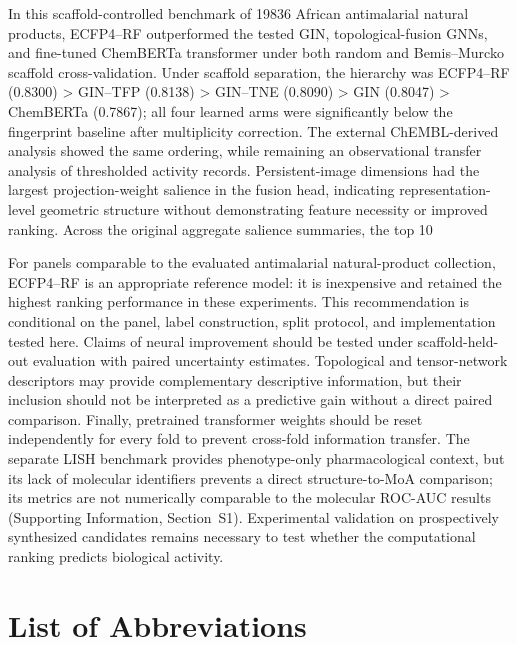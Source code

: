 \documentclass[11pt,a4paper]{article}
\begin{document}
In this scaffold-controlled benchmark of \num{19836} African antimalarial natural products, ECFP4--RF outperformed the tested GIN, topological-fusion GNNs, and fine-tuned ChemBERTa transformer under both random and Bemis--Murcko scaffold cross-validation. Under scaffold separation, the hierarchy was ECFP4--RF (\num{0.8300}) > GIN--TFP (\num{0.8138}) > GIN--TNE (\num{0.8090}) > GIN (\num{0.8047}) > ChemBERTa (\num{0.7867}); all four learned arms were significantly below the fingerprint baseline after multiplicity correction. The external ChEMBL-derived analysis showed the same ordering, while remaining an observational transfer analysis of thresholded activity records. Persistent-image dimensions had the largest projection-weight salience in the fusion head, indicating representation-level geometric structure without demonstrating feature necessity or improved ranking. Across the original aggregate salience summaries, the top 10%

For panels comparable to the evaluated antimalarial natural-product collection, ECFP4--RF is an appropriate reference model: it is inexpensive and retained the highest ranking performance in these experiments. This recommendation is conditional on the panel, label construction, split protocol, and implementation tested here. Claims of neural improvement should be tested under scaffold-held-out evaluation with paired uncertainty estimates. Topological and tensor-network descriptors may provide complementary descriptive information, but their inclusion should not be interpreted as a predictive gain without a direct paired comparison. Finally, pretrained transformer weights should be reset independently for every fold to prevent cross-fold information transfer. The separate LISH benchmark provides phenotype-only pharmacological context, but its lack of molecular identifiers prevents a direct structure-to-MoA comparison; its metrics are not numerically comparable to the molecular ROC-AUC results (Supporting Information, Section~S1). Experimental validation on prospectively synthesized candidates remains necessary to test whether the computational ranking predicts biological activity.

\section{List of Abbreviations}
\end{document}
